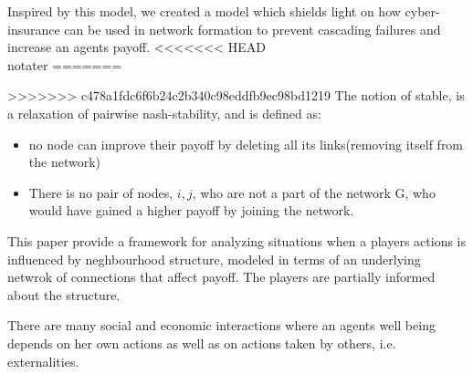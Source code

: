 Inspired by this model, we created a model which shields light on how cyber-insurance can be used in network formation to prevent cascading failures and increase an agents payoff.  
<<<<<<< HEAD
\\notater
=======

>>>>>>> c478a1fdc6f6b24c2b340c98eddfb9ec98bd1219
The notion of stable, is a relaxation of pairwise nash-stability, and is defined as:
\begin{itemize}
\item no node can improve their payoff by deleting all its links(removing itself from the network)
\item There is no pair of nodes, $i,j$, who are not a part of the network G, who would have gained a higher payoff by joining the network.
\end{itemize}

This paper\cite{networkgames}  provide a framework for analyzing situations when a players actions is influenced by neghbourhood structure, modeled in terms of an underlying netwrok of connections that affect payoff.
The players are partially informed about the structure. 

There are many social and economic interactions where an agents well being depends on her own actions as well as on actions taken by others, i.e. externalities. 


